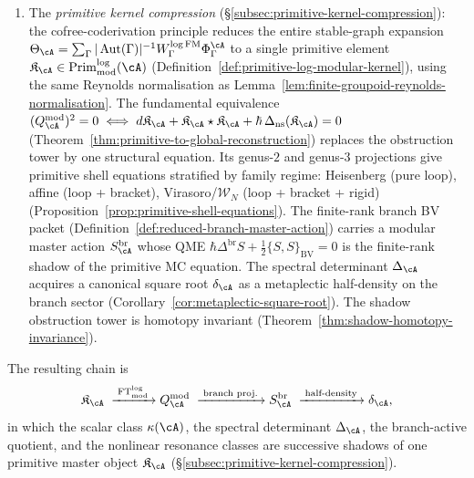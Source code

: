 \begin{summary}
\begin{enumerate}[label=\textup{(\alph*)}]
 maps~$\operatorname{Ob}_g$
 (Construction~\ref{const:vol1-genus-spectral-sequence}).
\item The \emph{primitive kernel compression}
 (\S\ref{subsec:primitive-kernel-compression}):
 the cofree-coderivation principle reduces the entire stable-graph
 expansion $\Theta_\cA = \sum_\Gamma |\operatorname{Aut}(\Gamma)|^{-1}
 W_\Gamma^{\log\mathrm{FM}}\Phi_\Gamma^\cA$ to a single primitive
 element $\mathfrak{K}_\cA \in \operatorname{Prim}^{\log}_{\mathrm{mod}}(\cA)$
 (Definition~\ref{def:primitive-log-modular-kernel}), using the same
 Reynolds normalisation as
 Lemma~\ref{lem:finite-groupoid-reynolds-normalisation}. The fundamental
 equivalence $(Q_\cA^{\mathrm{mod}})^2 = 0 \iff d\mathfrak{K}_\cA +
 \mathfrak{K}_\cA \star \mathfrak{K}_\cA +
 \hbar\,\Delta_{\mathrm{ns}}(\mathfrak{K}_\cA) = 0$
 (Theorem~\ref{thm:primitive-to-global-reconstruction}) replaces the
 obstruction tower by one structural equation. Its genus-$2$ and
 genus-$3$ projections give primitive shell equations stratified
 by family regime: Heisenberg (pure loop), affine (loop + bracket),
 Virasoro/$\mathcal{W}_N$ (loop + bracket + rigid)
 (Proposition~\ref{prop:primitive-shell-equations}).
 The finite-rank branch BV packet
 (Definition~\ref{def:reduced-branch-master-action}) carries a
 modular master action $S_\cA^{\mathrm{br}}$ whose QME
 $\hbar\Delta^{\mathrm{br}} S + \frac{1}{2}\{S,S\}_{\mathrm{BV}} = 0$
 is the finite-rank shadow of the primitive MC equation.
 The spectral determinant $\Delta_\cA$ acquires a canonical square
 root $\delta_\cA$ as a metaplectic half-density on the branch
 sector (Corollary~\ref{cor:metaplectic-square-root}).
 The shadow obstruction tower is homotopy invariant
 (Theorem~\ref{thm:shadow-homotopy-invariance}).
\end{enumerate}

The resulting chain is
\[
\mathfrak{K}_\cA
\;\xrightarrow{\;\operatorname{FT}^{\log}_{\mathrm{mod}}\;}
Q_\cA^{\mathrm{mod}}
\;\xrightarrow{\;\text{branch proj.}\;}
S_\cA^{\mathrm{br}}
\;\xrightarrow{\;\text{half-density}\;}
\delta_\cA,
\]
in which the scalar class $\kappa(\cA)$, the spectral determinant
$\Delta_\cA$, the branch-active quotient, and the nonlinear resonance
classes are successive shadows of one primitive master object
$\mathfrak{K}_\cA$
(\S\ref{subsec:primitive-kernel-compression}).
\end{summary}

